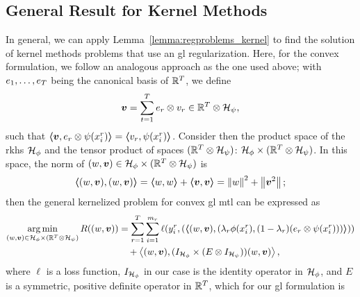 \subsection{General Result for Kernel Methods}
In general, we can apply Lemma~\ref{lemma:regproblems_kernel} to find the solution of kernel methods problems that use an \acrshort{gl} regularization.
Here, for the convex formulation, we follow an analogous approach as the one used above; with ${e_1, \ldots, e_T}$ being the canonical basis of $\mathbb{R}^T$, we define
\begin{equation}
    \label{eq:vtensor_def}
    \fv{v} = \sum_{t=1}^T e_r \otimes v_r \in \reals^\ntasks \otimes \hilbertspace_\psi,
\end{equation}
such that
$\bm{\left\langle} \bm{v}, e_r \otimes \psi(x_i^r) \bm{\right\rangle} = \bm{\left\langle} v_r, \psi(x_i^r) \bm{\right\rangle}$.
Consider then the product space of the \acrshort{rkhs} $\mathcal{H}_\phi$ and the tensor product of spaces $(\mathbb{R}^T \otimes \mathcal{H}_\psi)$: $\mathcal{H}_\phi \times (\mathbb{R}^T \otimes \mathcal{H}_\psi)$. In this space, the norm of $(w, \bm{v}) \in \mathcal{H}_\phi \times (\mathbb{R}^T \otimes \mathcal{H}_\psi)$ is
$$\bm{\left\langle} (w, \bm{v}), (w, \bm{v}) \bm{\right\rangle} =  \bm{\left\langle} w, w \bm{\right\rangle} + \bm{\left\langle} \bm{v}, \bm{v} \bm{\right\rangle} = \left\lVert w\right\rVert^2 + \left\lVert\bm{v}^2\right\rVert; $$
then the general kernelized problem for convex \acrshort{gl} \acrshort{mtl} can be expressed as
\begin{equation}\label{eq:cvxgl_general_problem_tensor}
    \begin{aligned}
        \argmin_{(w, \fv{v}) \in \hilbertspace_\phi \times (\reals^\ntasks \otimes \hilbertspace_\psi)} R((w, \fv{v})) & = \sum_{r=1}^\ntasks \sum_{i=1}^{\npertask_r} \ell(y_i^r, (\dotp{(w, \fv{v})}{(\lambda_r \phi(x_i^r), (1 - \lambda_r) (e_r \otimes \psi({x}_i^r)))})) \\
                                                                                                                       & \quad + \dotp{(w, \fv{v})}{(I_{\rkhs_\phi} \times (E \otimes I_{\rkhs_\psi})) (w, \fv{v})}  ,
    \end{aligned}
\end{equation}
where $\ell$ is a loss function, $I_{\mathcal{H}_\phi}$ in our case is the identity operator in $\mathcal{H}_\phi$, and $E$ is a symmetric, positive definite operator in $\mathbb{R}^T$, which for our \acrshort{gl} formulation is
